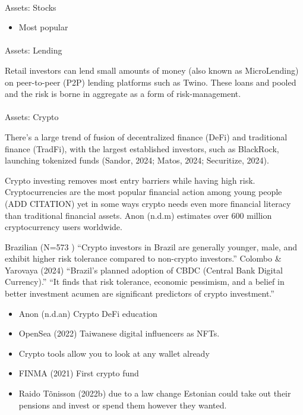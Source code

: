 \documentclass[
  letterpaper,
  DIV=11,
  numbers=noendperiod]{scrartcl}
\makeatletter
\let\oldparagraph\paragraph
\renewcommand{\paragraph}{
    \@ifstar
      \xxxParagraphStar
      \xxxParagraphNoStar
  }
\newcommand{\xxxParagraphStar}[1]{\oldparagraph*{#1}\mbox{}}
\newcommand{\xxxParagraphNoStar}[1]{\oldparagraph{#1}\mbox{}}
\providecommand{\tightlist}{%
  \setlength{\itemsep}{0pt}\setlength{\parskip}{0pt}}\usepackage{longtable,booktabs,array}
\makeatother
\begin{document}
\paragraph{Assets: Stocks}\label{assets-stocks}

\begin{itemize}
\tightlist
\item
  Most popular
\end{itemize}

\paragraph{Assets: Lending}\label{assets-lending}

Retail investors can lend small amounts of money (also known as
MicroLending) on peer-to-peer (P2P) lending platforms such as Twino.
These loans and pooled and the risk is borne in aggregate as a form of
risk-management.

\paragraph{Assets: Crypto}\label{assets-crypto}

There's a large trend of fusion of decentralized finance (DeFi) and
traditional finance (TradFi), with the largest established investors,
such as BlackRock, launching tokenized funds (Sandor, 2024; Matos, 2024;
Securitize, 2024).

Crypto investing removes most entry barriers while having high risk.
Cryptocurrencies are the most popular financial action among young
people (ADD CITATION) yet in some ways crypto needs even more financial
literacy than traditional financial assets. Anon (n.d.m) estimates over
600 million cryptocurrency users worldwide.

Brazilian (N=573 ) ``Crypto investors in Brazil are generally younger,
male, and exhibit higher risk tolerance compared to non-crypto
investors.'' Colombo \& Yarovaya (2024) ``Brazil's planned adoption of
CBDC (Central Bank Digital Currency).'' ``It finds that risk tolerance,
economic pessimism, and a belief in better investment acumen are
significant predictors of crypto investment.''

\begin{itemize}
\item
  Anon (n.d.an) Crypto DeFi education
\item
  OpenSea (2022) Taiwanese digital influencers as NFTs.
\item
  Crypto tools allow you to look at any wallet already
\item
  FINMA (2021) First crypto fund
\item
  Raido Tõnisson (2022b) due to a law change Estonian could take out
  their pensions and invest or spend them however they wanted.
\end{itemize}
\end{document}
